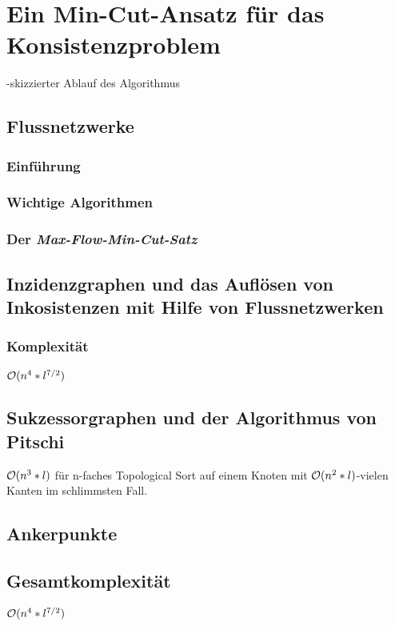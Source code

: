 \chapter{Ein Min-Cut-Ansatz für das Konsistenzproblem}
\label{ch:min-cut}
-skizzierter Ablauf des Algorithmus

\section{Flussnetzwerke}

\subsection{Einführung}

\subsection{Wichtige Algorithmen}

\subsection{Der \emph{Max-Flow-Min-Cut-Satz}}

\section{Inzidenzgraphen und das Auflösen von Inkosistenzen mit Hilfe von Flussnetzwerken}

\subsection{Komplexität}
$\mathcal{O}(n^4*l^{7/2})$

\section{Sukzessorgraphen und der Algorithmus von Pitschi}
$\mathcal{O}(n^3 * l)$ für n-faches Topological Sort auf einem Knoten mit $\mathcal{O}(n^2 * l)$-vielen Kanten im schlimmsten Fall.

\section{Ankerpunkte}

\section{Gesamtkomplexität}
$\mathcal{O}(n^4*l^{7/2})$